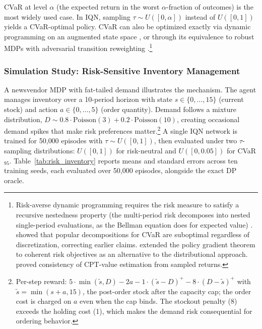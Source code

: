 CVaR at level $\alpha$ (the expected return in the worst $\alpha$-fraction
of outcomes) is the most widely used case. In IQN, sampling
$\tau \sim U([0, \alpha])$ instead of $U([0,1])$ yields a CVaR-optimal
policy. CVaR can also be optimized exactly via dynamic programming on an
augmented state space \citep{Bauerle2011}, or through its equivalence to
robust MDPs with adversarial transition reweighting
\citep{Chow2015}.\footnote{Risk-averse dynamic programming requires the
risk measure to satisfy a recursive nestedness property (the
multi-period risk decomposes into nested single-period evaluations, as
the Bellman equation does for expected value)
\citep{Ruszczynski2010}. \citet{Hau2023} showed that popular decompositions
for CVaR are suboptimal regardless of discretization, correcting earlier
claims. \citet{Tamar2015} extended the policy gradient theorem to coherent
risk objectives as an alternative to the distributional approach.
\citet{Prashanth2016} proved consistency of CPT-value estimation from
sampled returns.}


\subsubsection{Simulation Study: Risk-Sensitive Inventory Management}
\label{subsec:sim_risk_inventory}

A newsvendor MDP with fat-tailed demand illustrates the mechanism.
The agent manages inventory over a 10-period horizon with state
$s \in \{0, \ldots, 15\}$ (current stock) and action $a \in \{0, \ldots, 5\}$
(order quantity). Demand follows a mixture distribution,
$D \sim 0.8 \cdot \text{Poisson}(3) + 0.2 \cdot \text{Poisson}(10)$,
creating occasional demand spikes that make risk preferences
matter.\footnote{Per-step reward:
$5 \cdot \min(\tilde{s}, D) - 2a - 1 \cdot (\tilde{s}-D)^+ - 8 \cdot (D-\tilde{s})^+$
with $\tilde{s} = \min(s+a, 15)$, the post-order stock after the
capacity cap; the order cost is charged on $a$ even when the cap binds.
The stockout penalty (8) exceeds the holding cost (1), which makes the
demand risk consequential for ordering behavior.}
A single IQN network is trained for 50{,}000 episodes with
$\tau \sim U([0,1])$, then evaluated under two $\tau$-sampling
distributions: $U([0,1])$ for risk-neutral and $U([0, 0.05])$ for
CVaR$_{95}$. Table~\ref{tab:risk_inventory} reports means and standard
errors across ten training seeds, each evaluated over 50{,}000
episodes, alongside the exact DP oracle.

\begin{table}[h]
\centering
\caption{Risk-sensitive inventory management. Mean $\pm$ SE across ten
training seeds, 50{,}000 evaluation episodes per seed. Avg.\ Order is
the per-state mean order quantity averaged uniformly across inventory
levels.}
\label{tab:risk_inventory}

\end{table}

